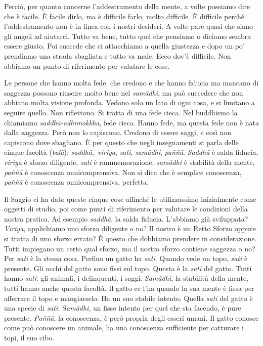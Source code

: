 Perciò, per quanto concerne l'addestramento della mente, a volte
possiamo dire che è facile. È facile dirlo, ma è difficile farlo, molto
difficile. È difficile perché l'addestramento non è in linea con i
nostri desideri. A volte pare quasi che siano gli angeli ad aiutarci.
Tutto va bene, tutto quel che pensiamo o diciamo sembra essere giusto.
Poi succede che ci attacchiamo a quella giustezza e dopo un po'
prendiamo una strada sbagliata e tutto va male. Ecco dov'è difficile.
Non abbiamo un punto di riferimento per valutare le cose.

Le persone che hanno molta fede, che credono e che hanno fiducia ma
mancano di saggezza possono riuscire molto bene nel \emph{samādhi}, ma
può succedere che non abbiano molta visione profonda. Vedono solo un
lato di ogni cosa, e si limitano a seguire quello. Non riflettono. Si
tratta di una fede cieca. Nel buddhismo la chiamiamo
\emph{saddhā-adhimokkha}, fede cieca. Hanno fede, ma questa fede non è
nata dalla saggezza. Però non lo capiscono. Credono di essere saggi, e
così non capiscono dove sbagliano. È per questo che negli insegnamenti
si parla delle cinque facoltà (\emph{balā}):
\emph{saddhā},\emph{~viriya}, \emph{sati}, \emph{samādhi}, \emph{paññā}.
\emph{Saddhā} è salda fiducia, \emph{viriya} è sforzo diligente,
\emph{sati} è rammemorazione, \emph{samādhi} è stabilità della mente,
\emph{paññā} è conoscenza onnicomprensiva. Non si dica che è semplice
conoscenza, \emph{paññā} è conoscenza onnicomprensiva, perfetta.

Il Saggio ci ha dato queste cinque cose affinché le utilizzassimo
inizialmente come oggetti di studio, poi come punti di riferimento per
valutare le condizioni della nostra pratica. Ad esempio \emph{saddhā},
la salda fiducia. L'abbiamo già sviluppata? \emph{Viriya}, applichiamo
uno sforzo diligente o no? Il nostro è un Retto Sforzo oppure si tratta
di uno sforzo errato? È questo che dobbiamo prendere in considerazione.
Tutti impiegano un certo qual sforzo, ma il nostro sforzo contiene
saggezza o no? Per \emph{sati} è la stessa cosa. Perfino un gatto ha
\emph{sati}. Quando vede un topo, \emph{sati} è presente. Gli occhi del
gatto sono fissi sul topo. Questa è la \emph{sati} del gatto. Tutti
hanno \emph{sati}: gli animali, i delinquenti, i saggi. \emph{Samādhi},
la stabilità della mente, tutti hanno anche questa facoltà. Il gatto ce
l'ha quando la sua mente è fissa per afferrare il topo e mangiarselo. Ha
un suo stabile intento. Quella \emph{sati} del gatto è una specie di
\emph{sati.} S\emph{amādhi}, un fisso intento per quel che sta facendo,
è pure presente. \emph{Paññā}, la conoscenza, è però propria degli
esseri umani. Il gatto conosce come può conoscere un animale, ha una
conoscenza sufficiente per catturare i topi, il suo cibo.


